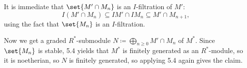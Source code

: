 It is immediate that $\set{M'\cap M_n}$ is an $I$-filtration of $M'$:
\[ I(M' \cap M_n) \subseteq IM'\cap IM_n \subseteq M'\cap M_{n+1}, \]
using the fact that $\set{M_n}$ is an $I$-filtration.

Now we get a graded $R^*$-submodule $N\coloneqq \bigoplus_{n\geq 0} M'\cap M_n$ of $M^*$.
Since $\set{M_n}$ is stable, 5.4 yields that $M^*$ is finitely generated as
an $R^*$-module, so it is noetherian, so $N$ is finitely generated, so applying
5.4 again gives the claim.
